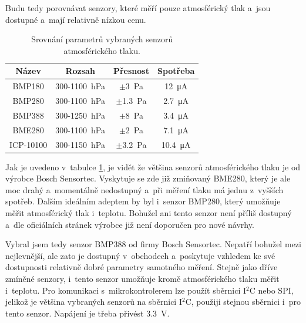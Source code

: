 Budu tedy porovnávat senzory, které měří pouze atmosférický tlak a~jsou dostupné a~mají relativně nízkou cenu.

\begin{table}[h]
    \caption{Srovnání parametrů vybraných senzorů atmosférického tlaku.}
    \centering
    \begin{tabular}{c|ccc}
        \textbf{Název} & \textbf{Rozsah}                     & \textbf{Přesnost}      & \textbf{Spotřeba}        \\ \hline
        BMP180 \cite{dat_BMP180}         & \SI{300}{}-\SI{1100}{\hecto\pascal} & $\pm$\SI{3}{\pascal}   & \SI{12}{\micro\ampere}   \\
        BMP280 \cite{dat_BMP280}         & \SI{300}{}-\SI{1100}{\hecto\pascal} & $\pm$\SI{1,3}{\pascal} & \SI{2,7}{\micro\ampere}  \\
        BMP388 \cite{dat_BMP388}         & \SI{300}{}-\SI{1250}{\hecto\pascal} & $\pm$\SI{8}{\pascal}   & \SI{3,4}{\micro\ampere}  \\
        BME280 \cite{dat_BME280}         & \SI{300}{}-\SI{1100}{\hecto\pascal} & $\pm$\SI{2}{\pascal}   & \SI{7,1}{\micro\ampere}  \\
        ICP-10100 \cite{dat_ICP-10100}      & \SI{300}{}-\SI{1150}{\hecto\pascal} & $\pm$\SI{3,2}{\pascal} & \SI{10,4}{\micro\ampere} 
    \end{tabular}
    \label{tab_AirPressureSensors}
\end{table}

Jak je uvedeno v~tabulce \ref{tab_AirPressureSensors}, je vidět že většina senzorů atmosférického tlaku je od výrobce Bosch Sensortec. Vyskytuje se zde již zmiňovaný BME280, který je ale moc drahý a~momentálně nedostupný a~při měření tlaku má jednu z~vyšších spotřeb. Dalším ideálním adeptem by byl i~senzor BMP280, který umožňuje měřit atmosférický tlak i~teplotu. Bohužel ani tento senzor není příliš dostupný a~dle oficiálních stránek výrobce již není doporučen pro nové návrhy.

Vybral jsem tedy senzor BMP388 od firmy Bosch Sensortec. Nepatří bohužel mezi nejlevnější, ale zato je dostupný v~obchodech a~poskytuje vzhledem ke své dostupnosti relativně dobré parametry samotného měření. Stejně jako dříve zmíněné senzory, i~tento senzor umožňuje kromě atmosférického tlaku měřit i~teplotu. Pro komunikaci s~mikrokontrolerem lze použít sběrnici I$^2$C nebo SPI, jelikož je většina vybraných senzorů na sběrnici I$^2$C, použiji stejnou sběrnici i~pro tento senzor. Napájení je třeba přivést \SI{3,3}{\volt}.

